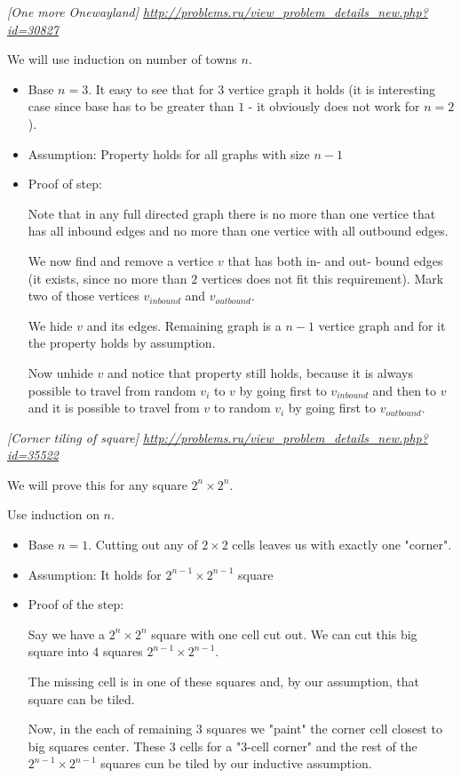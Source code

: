 \begin{problem}
\textit{[One more Onewayland] \url{http://problems.ru/view_problem_details_new.php?id=30827}}

We will use induction on number of towns $n$.
\begin{itemize}
\item Base $n=3$. It easy to see that for 3 vertice graph it holds (it is interesting case since base has to be greater than $1$ - it obviously does not work for $n=2$).
\item Assumption: Property holds for all graphs with size $n-1$
\item Proof of step:

Note that in any full directed graph there is no more than one vertice that has all inbound edges and no more than one vertice with all outbound edges.

We now find and remove a vertice $v$ that has both in- and out- bound edges (it exists, since no more than $2$ vertices does not fit this requirement). Mark two of those vertices $v_{inbound}$ and $v_{outbound}$. 

We hide $v$ and its edges. Remaining graph is a $n-1$ vertice graph and for it the property holds by assumption. 

Now unhide $v$ and notice that property still holds, because it is always possible to travel from random $v_i$ to $v$ by going first to $v_{inbound}$ and then to $v$ and it is possible to travel from $v$ to random $v_i$ by going first to $v_{outbound}$.
\end{itemize}
\end{problem}

\begin{problem}
\textit{[Corner tiling of square] \url{http://problems.ru/view_problem_details_new.php?id=35522}}

We will prove this for any square $2^n\times 2^n$.

Use induction on $n$.
\begin{itemize}
\item Base $n=1$. Cutting out any of $2\times2$ cells leaves us with exactly one "corner".
\item Assumption: It holds for $2^{n-1}\times 2^{n-1}$ square
\item Proof of the step:

Say we have a $2^n \times 2^n$ square with one cell cut out. We can cut this big square into $4$ squares $2^{n-1} \times 2^{n-1}$.

The missing cell is in one of these squares and, by our assumption, that square can be tiled.

Now, in the each of remaining $3$ squares we "paint" the corner cell closest to big squares center. These $3$ cells for a "3-cell corner" and the rest of the $2^{n-1} \times 2^{n-1}$ squares cun be tiled by our inductive assumption.

\end{itemize}
\end{problem}
%

